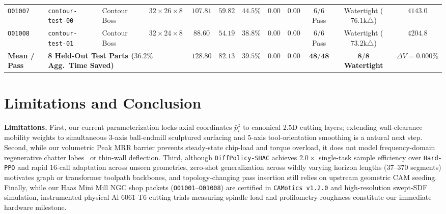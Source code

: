 \documentclass[conference]{IEEEtran}
\begin{document}
\begin{table}[t]
{\begin{tabular}{lllccccccccc}
    \texttt{O01007} & \texttt{contour-test-00} & Contour Boss & $32\!\times\!26\!\times\!8$ & $107.81$ & $59.82$ & $44.5\%$ & $0.00$ & $0.00$ & $6/6$ Pass & Watertight ($76.1\text{k}\triangle$) & $4143.0$ \\
    \texttt{O01008} & \texttt{contour-test-01} & Contour Boss & $32\!\times\!24\!\times\!8$ & $88.60$ & $54.19$ & $38.8\%$ & $0.00$ & $0.00$ & $6/6$ Pass & Watertight ($73.2\text{k}\triangle$) & $4204.8$ \\
    \midrule
    \textbf{Mean / Pass} & \multicolumn{3}{l}{\textbf{8 Held-Out Test Parts ($36.2\%$ Agg.\ Time Saved)}} & $\mathbf{128.80}$ & $\mathbf{82.13}$ & $\mathbf{39.5\%}$ & $\mathbf{0.00}$ & $\mathbf{0.00}$ & $\mathbf{48/48}$ & $\mathbf{8/8}$ \textbf{Watertight} & $\Delta V = 0.000\%$ \\
    \bottomrule
  \end{tabular}%
  }
  \vspace{-0.8em}
\end{table}

\section{Limitations and Conclusion}
\label{sec:conclusion}

\textbf{Limitations.}
First, our current parameterization locks axial coordinates $\bar{p}_i^z$ to canonical 2.5D cutting layers; extending wall-clearance mobility weights to simultaneous 3-axis ball-endmill sculptured surfacing and 5-axis tool-orientation smoothing is a natural next step. Second, while our volumetric Peak MRR barrier prevents steady-state chip-load and torque overload, it does not model frequency-domain regenerative chatter lobes~\cite{altintas2012manufacturing} or thin-wall deflection. Third, although \texttt{DiffPolicy-SHAC} achieves $2.0\times$ single-task sample efficiency over \texttt{Hard-PPO} and rapid 16-call adaptation across unseen geometries, zero-shot generalization across wildly varying horizon lengths ($37$--$370$ segments) motivates graph or transformer toolpath backbones, and topology-changing pass insertion still relies on upstream geometric CAM seeding. Finally, while our Haas Mini Mill NGC shop packets (\texttt{O01001}--\texttt{O01008}) are certified in \texttt{CAMotics v1.2.0} and high-resolution swept-SDF simulation, instrumented physical Al 6061-T6 cutting trials measuring spindle load and profilometry roughness constitute our immediate hardware milestone.
\end{document}

